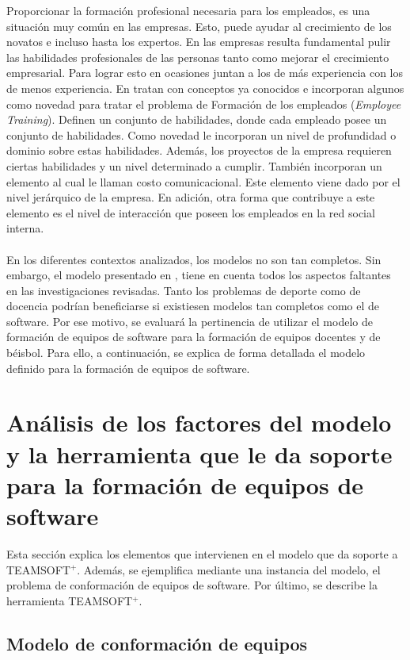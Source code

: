 Proporcionar la formación profesional necesaria para los empleados, es una situación muy común en las empresas. Esto, puede ayudar al crecimiento de los novatos e incluso hasta los expertos. En las empresas resulta fundamental pulir las habilidades profesionales de las personas tanto como mejorar el crecimiento empresarial. Para lograr esto en ocasiones juntan a los de más experiencia con los de menos experiencia. En \cite{Zhang2017} tratan con conceptos ya conocidos e incorporan algunos como novedad para tratar el problema de Formación de los empleados (\textit{Employee Training}). Definen un conjunto de habilidades, donde cada empleado posee un conjunto de habilidades. Como novedad le incorporan un nivel de profundidad o dominio sobre estas habilidades. Además, los proyectos de la empresa requieren ciertas habilidades y un nivel determinado a cumplir. También incorporan un elemento al cual le llaman costo comunicacional. Este elemento viene dado por el nivel jerárquico de la empresa. En adición, otra forma que contribuye a este elemento es el nivel de interacción que poseen los empleados en la red social interna.\\\\

En los diferentes contextos analizados, los modelos no son tan completos. Sin embargo, el modelo presentado en \cite{Duran2019}, tiene en cuenta todos los aspectos faltantes en las investigaciones revisadas. Tanto los problemas de deporte como de docencia podrían beneficiarse si existiesen modelos tan completos como el de software. Por ese motivo, se evaluará la pertinencia de utilizar el modelo de formación de equipos de software para la formación de equipos docentes y de béisbol. Para ello, a continuación, se explica de forma detallada el modelo definido para la formación de equipos de software.

\section{Análisis de los factores del modelo y la herramienta que le da soporte para la formación de equipos de software}

Esta sección explica los elementos que intervienen en el modelo que da soporte a TEAMSOFT$^+$. Además, se ejemplifica mediante una instancia del modelo, el problema de conformación de equipos de software. Por último, se describe la herramienta TEAMSOFT$^+$.

\subsection{Modelo de conformación de equipos} \label{sec:modelo-teamsoft}

